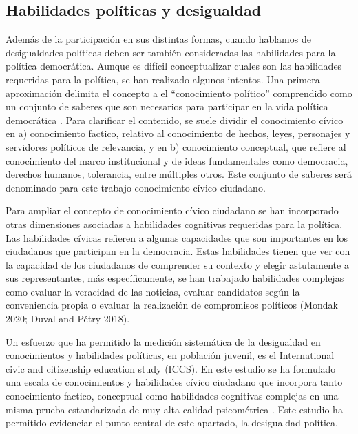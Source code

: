 \documentclass[12pt,twoside]{templates/facsothesis}
\begin{document}
\hypertarget{habilidades-poluxedticas-y-desigualdad}{%
\subsection{Habilidades políticas y desigualdad}\label{habilidades-poluxedticas-y-desigualdad}}

Además de la participación en sus distintas formas, cuando hablamos de desigualdades políticas deben ser también consideradas las habilidades para la política democrática. Aunque es difícil conceptualizar cuales son las habilidades requeridas para la política, se han realizado algunos intentos. Una primera aproximación delimita el concepto a el ``conocimiento político'' comprendido como un conjunto de saberes que son necesarios para participar en la vida política democrática \citep[ ]{petricevic_Why_2020}. Para clarificar el contenido, se suele dividir el conocimiento cívico en a) conocimiento factico, relativo al conocimiento de hechos, leyes, personajes y servidores políticos de relevancia, y en b) conocimiento conceptual, que refiere al conocimiento del marco institucional y de ideas fundamentales como democracia, derechos humanos, tolerancia, entre múltiples otros. Este conjunto de saberes será denominado para este trabajo conocimiento cívico ciudadano.

Para ampliar el concepto de conocimiento cívico ciudadano se han incorporado otras dimensiones asociadas a habilidades cognitivas requeridas para la política. Las habilidades cívicas refieren a algunas capacidades que son importantes en los ciudadanos que participan en la democracia. Estas habilidades tienen que ver con la capacidad de los ciudadanos de comprender su contexto y elegir astutamente a sus representantes, más específicamente, se han trabajado habilidades complejas como evaluar la veracidad de las noticias, evaluar candidatos según la conveniencia propia o evaluar la realización de compromisos políticos (Mondak 2020; Duval and Pétry 2018).

Un esfuerzo que ha permitido la medición sistemática de la desigualdad en conocimientos y habilidades políticas, en población juvenil, es el International civic and citizenship education study (ICCS). En este estudio se ha formulado una escala de conocimientos y habilidades cívico ciudadano que incorpora tanto conocimiento factico, conceptual como habilidades cognitivas complejas en una misma prueba estandarizada de muy alta calidad psicométrica \citep{schulz_Initial_2010} . Este estudio ha permitido evidenciar el punto central de este apartado, la desigualdad política.
\end{document}
